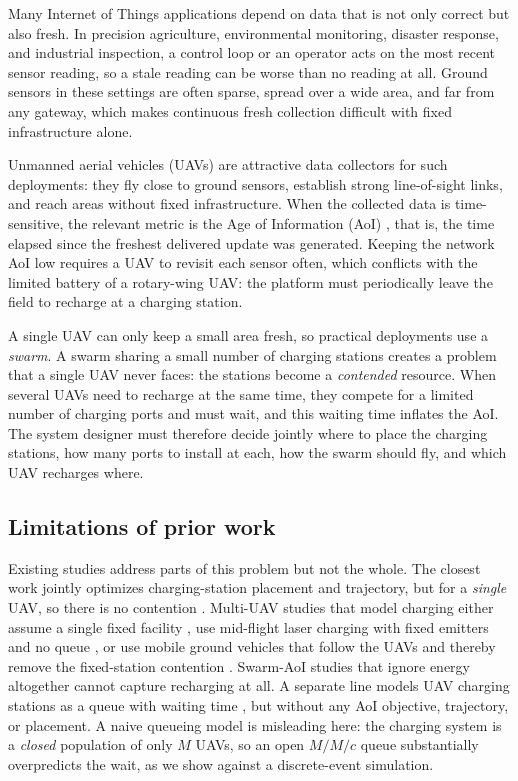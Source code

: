 Many Internet of Things applications depend on data that is not only correct but
also fresh. In precision agriculture, environmental monitoring, disaster
response, and industrial inspection, a control loop or an operator acts on the
most recent sensor reading, so a stale reading can be worse than no reading at
all. Ground sensors in these settings are often sparse, spread over a wide area,
and far from any gateway, which makes continuous fresh collection difficult with
fixed infrastructure alone.

Unmanned aerial vehicles (UAVs) are attractive data collectors for such
deployments: they fly close to ground sensors, establish strong line-of-sight
links, and reach areas without fixed infrastructure. When the collected data is
time-sensitive, the relevant metric is the Age of Information (AoI)
\cite{kaul2012aoi}, that is, the time elapsed since the freshest delivered
update was generated. Keeping the network AoI low requires a UAV to revisit each
sensor often, which conflicts with the limited battery of a rotary-wing UAV: the
platform must periodically leave the field to recharge at a charging station.

A single UAV can only keep a small area fresh, so practical deployments use a
\emph{swarm}. A swarm sharing a small number of charging stations creates a
problem that a single UAV never faces: the stations become a \emph{contended}
resource. When several UAVs need to recharge at the same time, they compete for
a limited number of charging ports and must wait, and this waiting time inflates
the AoI. The system designer must therefore decide jointly where to place the
charging stations, how many ports to install at each, how the swarm should fly,
and which UAV recharges where.

\subsection{Limitations of prior work}
Existing studies address parts of this problem but not the whole. The closest
work jointly optimizes charging-station placement and trajectory, but for a
\emph{single} UAV, so there is no contention \cite{base2024}. Multi-UAV studies
that model charging either assume a single fixed facility \cite{wei2024}, use
mid-flight laser charging with fixed emitters and no queue \cite{sun2025laser},
or use mobile ground vehicles that follow the UAVs and thereby remove the
fixed-station contention \cite{oubbati2024ugv,zhao2025aoi}. Swarm-AoI studies
that ignore energy altogether \cite{eldeeb2023swarm} cannot capture recharging
at all. A separate line models UAV charging stations as a queue with waiting
time \cite{ev2022sharing}, but without any AoI objective, trajectory, or
placement. A naive queueing model is misleading here: the charging
system is a \emph{closed} population of only $M$ UAVs, so an open $M/M/c$ queue
substantially overpredicts the wait, as we show against a discrete-event
simulation.

